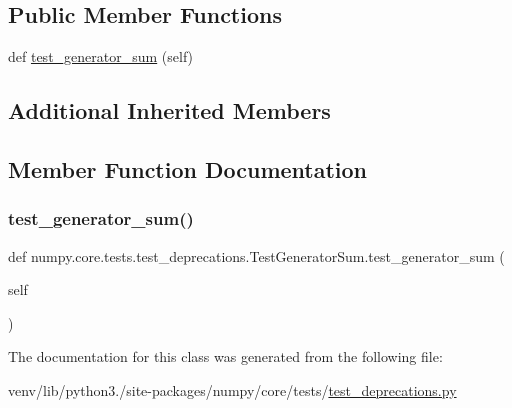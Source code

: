 \subsection*{Public Member Functions}
\begin{DoxyCompactItemize}
\item 
def \hyperlink{classnumpy_1_1core_1_1tests_1_1test__deprecations_1_1TestGeneratorSum_aa4ec31f7b5ae7dd49bcec7fb0d7ed1e9}{test\+\_\+generator\+\_\+sum} (self)
\end{DoxyCompactItemize}
\subsection*{Additional Inherited Members}


\subsection{Member Function Documentation}
\mbox{\label{classnumpy_1_1core_1_1tests_1_1test__deprecations_1_1TestGeneratorSum_aa4ec31f7b5ae7dd49bcec7fb0d7ed1e9}} 
\subsubsection{\texorpdfstring{test\+\_\+generator\+\_\+sum()}{test\_generator\_sum()}}
{\footnotesize\ttfamily def numpy.\+core.\+tests.\+test\+\_\+deprecations.\+Test\+Generator\+Sum.\+test\+\_\+generator\+\_\+sum (\begin{DoxyParamCaption}\item[{}]{self }\end{DoxyParamCaption})}



The documentation for this class was generated from the following file\+:\begin{DoxyCompactItemize}
\item 
venv/lib/python3./site-\/packages/numpy/core/tests/\hyperlink{core_2tests_2test__deprecations_8py}{test\+\_\+deprecations.\+py}\end{DoxyCompactItemize}
